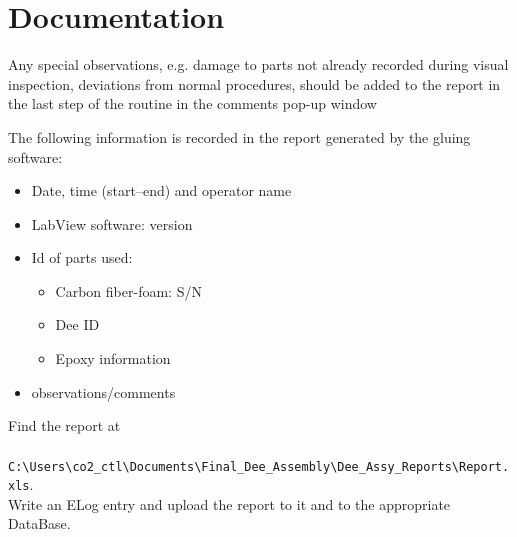 \documentclass[12pt]{cornelltfpxsop}
\begin{document}
\section{Documentation}

Any special observations, e.g. damage to parts not already recorded during visual inspection, deviations from normal procedures, should be added to the report in the last step of the routine in the comments pop-up window 

The following information is recorded in the report generated by the gluing software:
\begin{itemize}
    \item Date, time (start--end) and operator name
    \item LabView software: version
    \item Id of parts used:
	\begin{itemize}
	    \item Carbon fiber-foam: S/N
	    \item Dee ID
	    \item Epoxy information
	\end{itemize}
    \item observations/comments
\end{itemize}

Find the report at \\ \verb| C:\Users\co2_ctl\Documents\Final_Dee_Assembly\Dee_Assy_Reports\Report.xls|.\\ Write an ELog entry and upload the report to it and to the appropriate DataBase.  
\end{document}
